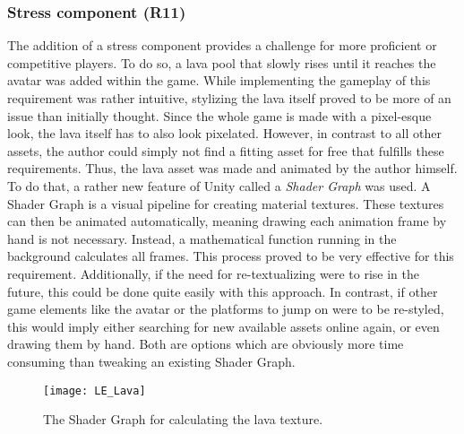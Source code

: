\documentclass[draft,final]{vutinfth} %
\begin{document}
\subsubsection{Stress component (R11)}
The addition of a stress component provides a challenge for more proficient or competitive players. To do so, a lava pool that slowly rises until it reaches the avatar was added within the game. While implementing the gameplay of this requirement was rather intuitive, stylizing the lava itself proved to be more of an issue than initially thought. Since the whole game is made with a pixel-esque look, the lava itself has to also look pixelated. However, in contrast to all other assets, the author could simply not find a fitting asset for free that fulfills these requirements. Thus, the lava asset was made and animated by the author himself. To do that, a rather new feature of Unity called a \emph{Shader Graph} was used. A Shader Graph is a visual pipeline for creating material textures. These textures can then be animated automatically, meaning drawing each animation frame by hand is not necessary. Instead, a mathematical function running in the background calculates all frames. This process proved to be very effective for this requirement. Additionally, if the need for re-textualizing were to rise in the future, this could be done quite easily with this approach. In contrast, if other game elements like the avatar or the platforms to jump on were to be re-styled, this would imply either searching for new available assets online again, or even drawing them by hand. Both are options which are obviously more time consuming than tweaking an existing Shader Graph.


\begin{figure}
\begin{center}
\texttt{[image: LE\_Lava]}
\end{center}
\caption{The Shader Graph for calculating the lava texture.}
\end{figure}
\end{document}
